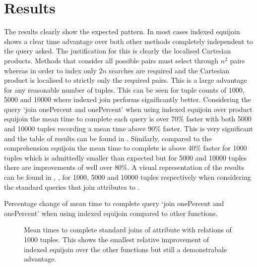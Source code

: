 \section{Results}
The results clearly show the expected pattern. In most cases indexed equijoin
shows a clear time advantage over both other methods completely independent to
the query asked. The justification for this is clearly the localised Cartesian
products. Methods that consider all possible pairs must select through $n^2$
pairs whereas in order to index only $2n$ searches are required and the
Cartesian product is localised to strictly only the required pairs. This is a
large advantage for any reasonable number of tuples. This can be seen for tuple
counts of 1000, 5000 and 10000 where indexed join performs significantly better.
Considering the query `join onePercent and onePercent' when using indexed
equijoin over product equijoin the mean time to complete each query is over 70\% faster
with both 5000 and 10000 tuples recording a mean time above 90\% faster. This
is very significant and the table of results can be found in
. Similarly, compared to the comprehension
equijoin the mean time to complete is above 40\% faster for 1000 tuples which is
admittedly smaller than expected but for 5000 and 10000 tuples there are
improvements of well over 80\%. A visual representation of the results can be
found in ,
,
 for 1000, 5000 and 10000 tuples
respectively when considering the standard queries that join attributes to
.

\begin{table}[b]
    \centering
    
    \caption{Percentage change of mean time to complete query `join onePercent
        and onePercent' when using indexed equijoin compared to other
    functions.}
    \label{tab:percentage-change-of-means-join-onePercent-and-onePercent}
\end{table}

\begin{figure}[p]
    
    \caption{Mean times to complete standard joins of
     attribute with relations of 1000 tuples. This
shows the smallest relative improvement of indexed equijoin over the other
functions but still a demonstrabale advantage.}
    \label{fig:benchmark:onePercent-1000}
\end{figure}

